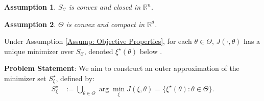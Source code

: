 \documentclass[letterpaper, 10 pt, conference]{ieeeconf}
\newcommand{\R}{\mathbb{R}}
\newcommand{\?}{\stackrel{?}{=}}
\newcommand{\obj}{J}
\newcommand{\param}{\theta}
\newcommand{\paramDim}{d}
\newcommand{\paramSet}{\Theta}
\newcommand{\var}{\xi}
\newcommand{\varOpt}{\var^\star}
\newcommand{\varDim}{n}
\newcommand{\varOptSet}{S_\var^\star}
\newcommand{\constraintSet}{{S_{\mathcal{C}}}}
\newcommand{\diam}{\text{diam}}
\newtheorem{assumption}{Assumption}
\newcommand{\frank}[1]{{\textcolor[rgb]{0,0,1}{\textsf{[Frank: {#1}]}}}}
\newcommand{\antoine}[1]{{\textcolor[rgb]{1,0,0}{\textsf{[Antoine: {#1}]}}}}
\begin{document}

\begin{assumption}
\label{Assump: Constraint Set is Convex and Closed}
$\constraintSet$ is convex and closed in $\R^\varDim$.
\end{assumption}

\begin{assumption}
\label{Assump: Parameter Set is Convex and Compact}
$\paramSet$ is convex and compact in $\R^\paramDim$. 
\end{assumption}

Under Assumption \ref{Assump: Objective Properties}, for each $\param \in \paramSet$, $\obj(\cdot, \param)$ has a unique minimizer over $\constraintSet$, denoted $\varOpt(\param)$ below \cite[Thm. 2.8]{WrightRecht2022OptimizationForDataAnalysis}.

\textbf{Problem Statement}:
We aim to construct an outer approximation of the minimizer set $\varOptSet$, defined by:
\begin{align}
\label{Eqn: Set of All Parameterized Minimizers}
    \varOptSet &:= \textstyle\bigcup_{\param \in \paramSet} \arg\min_\var \obj(\var, \param) = \big\{\varOpt(\param): \param \in \paramSet \big\}.
\end{align}
\end{document}
